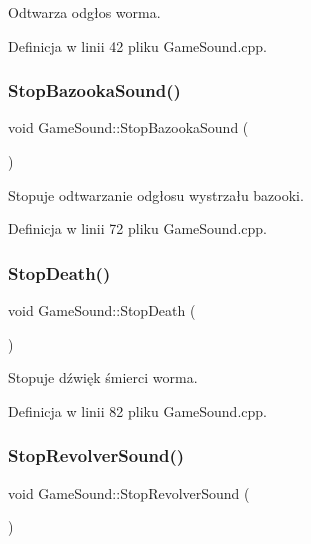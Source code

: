 Odtwarza odgłos worma. 



Definicja w linii 42 pliku Game\+Sound.\+cpp.

\mbox{\label{class_game_sound_a90742af83bd0006dba5e9a5129214c9a}} 
\subsubsection{\texorpdfstring{Stop\+Bazooka\+Sound()}{StopBazookaSound()}}
{\footnotesize\ttfamily void Game\+Sound\+::\+Stop\+Bazooka\+Sound (\begin{DoxyParamCaption}{ }\end{DoxyParamCaption})}



Stopuje odtwarzanie odgłosu wystrzału bazooki. 



Definicja w linii 72 pliku Game\+Sound.\+cpp.

\mbox{\label{class_game_sound_accb7034b9c796bc9270fc3a724d18821}} 
\subsubsection{\texorpdfstring{Stop\+Death()}{StopDeath()}}
{\footnotesize\ttfamily void Game\+Sound\+::\+Stop\+Death (\begin{DoxyParamCaption}{ }\end{DoxyParamCaption})}



Stopuje dźwięk śmierci worma. 



Definicja w linii 82 pliku Game\+Sound.\+cpp.

\mbox{\label{class_game_sound_a88651691b6b8e28f14e73778805bd898}} 
\subsubsection{\texorpdfstring{Stop\+Revolver\+Sound()}{StopRevolverSound()}}
{\footnotesize\ttfamily void Game\+Sound\+::\+Stop\+Revolver\+Sound (\begin{DoxyParamCaption}{ }\end{DoxyParamCaption})}



